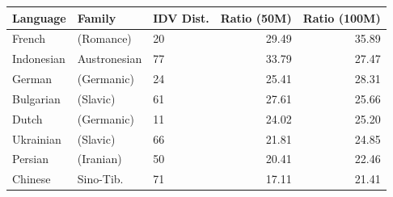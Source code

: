 \begin{tabular}{@{}lllrr@{}}
\toprule
Language & Family & IDV Dist. & Ratio (50M) & Ratio (100M) \\
\midrule
French       & (Romance)          &    20 &  29.49 &  35.89 \\
Indonesian   & Austronesian       &    77 &  33.79 &  27.47 \\
German       & (Germanic)         &    24 &  25.41 &  28.31 \\
Bulgarian    & (Slavic)           &    61 &  27.61 &  25.66 \\
Dutch        & (Germanic)         &    11 &  24.02 &  25.20 \\
Ukrainian    & (Slavic)           &    66 &  21.81 &  24.85 \\
Persian      & (Iranian)          &    50 &  20.41 &  22.46 \\
Chinese      & Sino-Tib.          &    71 &  17.11 &  21.41 \\
\bottomrule
\end{tabular}
